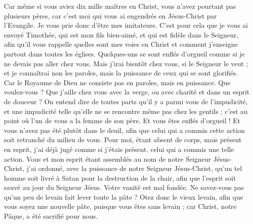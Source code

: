 \begin{multicols}{2}
Car même si vous aviez dix mille maîtres en Christ, vous n'avez pourtant pas plusieurs pères, car c'est moi qui vous ai engendrés en Jésus-Christ par l'Evangile.
Je vous prie donc d'être mes imitateurs.
C'est pour cela que je vous ai envoyé Timothée, qui est mon fils bien-aimé, et qui est fidèle dans le Seigneur, afin qu'il vous rappelle quelles sont mes voies en Christ et comment j'enseigne partout dans toutes les églises.
Quelques-uns se sont enflés d’orgueil comme si je ne devais pas aller chez vous.
Mais j'irai bientôt chez vous, si le Seigneur le veut ; et je connaîtrai non les paroles, mais la puissance de ceux qui se sont glorifiés.
Car le Royaume de Dieu ne consiste pas en paroles, mais en puissance.
Que voulez-vous ? Que j’aille chez vous avec la verge, ou avec charité et dans un esprit de douceur ?
\VerseOne{}On entend dire de toutes parts qu'il y a parmi vous de l’impudicité, et une impudicité telle qu’elle ne se rencontre même pas chez les gentils ; c'est au point où l’un de vous a la femme de son père.
Et vous êtes enflés d'orgueil ! Et vous n'avez pas été plutôt dans le deuil, afin que celui qui a commis cette action soit retranché du milieu de vous.
Pour moi, étant absent de corps, mais présent en esprit, j'ai déjà jugé comme si j'étais présent, celui qui a commis une telle action.
Vous et mon esprit étant assemblés au nom de notre Seigneur Jésus-Christ, j'ai ordonné, avec la puissance de notre Seigneur Jésus-Christ,
qu'un tel homme soit livré à Satan pour la destruction de la chair, afin que l'esprit soit sauvé au jour du Seigneur Jésus.
Votre vanité est mal fondée. Ne savez-vous pas qu'un peu de levain fait lever toute la pâte ?
Otez donc le vieux levain, afin que vous soyez une nouvelle pâte, puisque vous êtes sans levain ; car Christ, notre Pâque, a été sacrifié pour nous.

\end{multicols}
